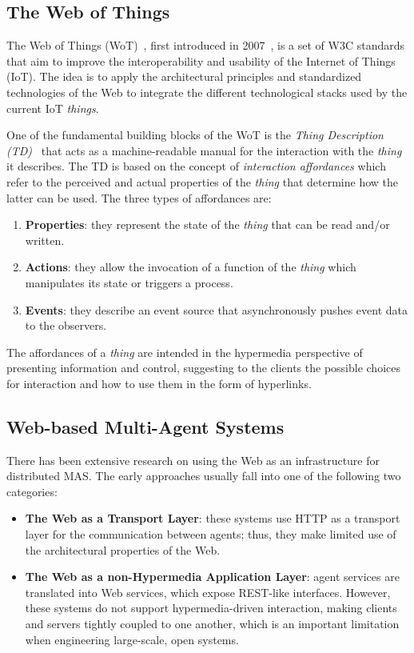 \subsection{The Web of Things}
The Web of Things (WoT)~\cite{wot}, first introduced in 2007~\cite{guinard2011web}, is a set of W3C standards that aim to improve the interoperability and usability of the Internet of Things (IoT).
The idea is to apply the architectural principles and standardized technologies of the Web to integrate the different technological stacks used by the current IoT \textit{things}.

One of the fundamental building blocks of the WoT is the \textit{Thing Description (TD)}~\cite{wottd} that acts as a machine-readable manual for the interaction with the \textit{thing} it describes.
The TD is based on the concept of \textit{interaction affordances} which refer to the perceived and actual properties of the \textit{thing} that determine how the latter can be used.
The three types of affordances are:
\begin{enumerate}
    \item \textbf{Properties}: they represent the state of the \textit{thing} that can be read and/or written.
    \item \textbf{Actions}: they allow the invocation of a function of the \textit{thing} which manipulates its state or triggers a process.
    \item \textbf{Events}: they describe an event source that asynchronously pushes event data to the observers.
\end{enumerate}
The affordances of a \textit{thing} are intended in the hypermedia perspective of presenting information and control, suggesting to the clients the possible choices for interaction and how to use them in the form of hyperlinks.

\subsection{Web-based Multi-Agent Systems}
There has been extensive research on using the Web as an infrastructure for distributed MAS.
The early approaches usually fall into one of the following two categories:
\begin{itemize}
    \item \textbf{The Web as a Transport Layer}: these systems use HTTP as a transport layer for the communication between agents; thus, they make limited use of the architectural properties of the Web.
    \item \textbf{The Web as a non-Hypermedia Application Layer}: agent services are translated into Web services, which expose REST-like interfaces.
    However, these systems do not support hypermedia-driven interaction, making clients and servers tightly coupled to one another, which is an important limitation when engineering large-scale, open systems.
\end{itemize}

